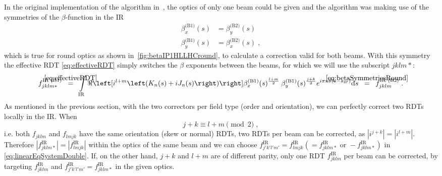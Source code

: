 In the original implementation of the algorithm in~\cite{BruningDynamicApertureStudies2004},
the optics of only one beam could be given and the algorithm was making use 
of the symmetries of the $\beta$-function in the IR
%
\begin{equation}
    \label{eq:betaSymmetriesRound}
    \begin{split}
        \beta_x^{\text{(B1)}}(s) &= \beta_y^{\text{(B2)}}(s) \\ 
        \beta_y^{\text{(B1)}}(s) &= \beta_x^{\text{(B2)}}(s) \;, 
    \end{split}
\end{equation}
%
which is true for round optics as shown in~\cref{fig:betaIP1HLLHCround}, to calculate a correction valid for both beams.
With this symmetry the effective RDT \cref{eq:effectiveRDT} simply switches the $\beta$ exponents between the beams, 
for which we will use the subscript {\scriptsize $jklm*$}: 
%
\begin{equation}
    \label{eq:effectiveRDT*}
    f^\text{IR (B1)}_{jklm*}  
    \;\; \overeq{\cref{eq:effectiveRDT}} \;\;
    \int\limits_\text{IR} 
    \ReOf{ 
     i^{l+m}
     \left(K_{n}(s) + iJ_{n}(s) \right) 
    }
        \beta^\text{(B1)}_x(s)^{\frac{l+m}{2}\;}
        \beta^\text{(B1)}_y(s)^{\frac{j+k}{2}} 
     e^{i \pi n \theta(s - s_\text{IP})}
    \mathrm{d}s 
    \;\; \overeq{\cref{eq:betaSymmetriesRound}} \;\;
    f^\text{IR (B2)}_{jklm}\; .
\end{equation}
%
As mentioned in the previous section, with the two correctors per field type (order and orientation),
we can perfectly correct two RDTs locally in the IR. 
When 
%
\begin{equation}
    j+k \equiv l+m \pmod{2} \;,
\end{equation}
%
i.e. both $f_{jklm}$ and $f_{lmjk}$ have the same orientation (skew or normal) RDTs, 
two RDTs per beam can be corrected, as $\left| i^{j+k} \right| = \left| i^{l+m} \right|$.
Therefore $\left| f^\text{IR}_{jklm*} \right| = \left| f^\text{IR}_{lmjk} \right|$ within the optics of the same beam
and we can choose $f^\text{IR}_{j'k'l'm'}  = f^\text{IR}_{lmjk} (= f^\text{IR}_{jklm*} \text{ or } -f^\text{IR}_{jklm*})$ in \cref{eq:linearEqSystemDouble}.
If, on the other hand, $j+k$ and $l+m$ are of different parity, only one RDT $f^\text{IR}_{jklm}$ per beam can be corrected, 
by targeting $f^\text{IR}_{jklm}$ and $f^\text{IR}_{j'k'l'm'} = f^\text{IR}_{jklm*}$ in the given optics.


